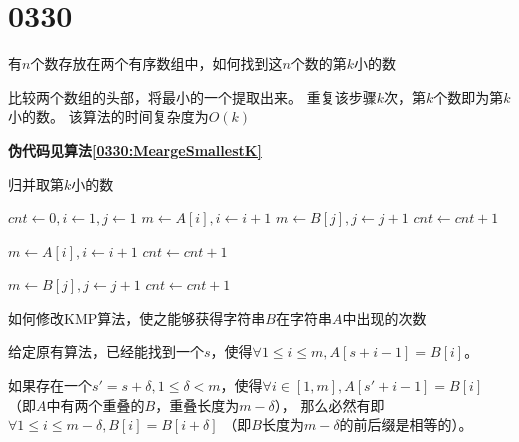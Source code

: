 \section{0330}\label{sec:0330}
\begin{questions}

    \question 有$n$个数存放在两个有序数组中，如何找到这$n$个数的第$k$小的数

    \begin{solution}
        比较两个数组的头部，将最小的一个提取出来。
        重复该步骤$k$次，第$k$个数即为第$k$小的数。
        该算法的时间复杂度为$O(k)$

        \textbf{伪代码见算法\ref{0330:MeargeSmallestK}}
    \end{solution}

    \begin{algorithm}[!htp]
        \caption{归并取第$k$小的数}\label{0330:MeargeSmallestK}
        \begin{algorithmic}[1]
             
            \State $cnt \gets 0, i \gets 1, j \gets 1$
            \State $m \gets A[i], i \gets i + 1$
            \Else
            \State $m \gets B[j], j \gets j + 1$
            \EndIf
            \State $cnt \gets cnt + 1$
            \EndWhile

            \State $m \gets A[i], i \gets i + 1$
            \State $cnt \gets cnt + 1$
            \EndWhile

            \State $m \gets B[j], j \gets j + 1$
            \State $cnt \gets cnt + 1$
            \EndWhile
        \end{algorithmic}
    \end{algorithm}


    \question 如何修改KMP算法，使之能够获得字符串$B$在字符串$A$中出现的次数

    \begin{solution}
        给定原有算法，已经能找到一个$s$，使得$\forall 1 \leq i \leq m, A[s+i-1] = B[i]$。

        如果存在一个$s' = s + \delta, 1 \leq \delta < m$，使得$\forall i \in [1,m], A[s'+i-1] = B[i]$
        （即$A$中有两个重叠的$B$，重叠长度为$m - \delta$），
        那么必然有即$\forall 1 \leq i \leq m-\delta, B[i] = B[i+\delta]$
        （即$B$长度为$m-\delta$的前后缀是相等的）。


\end{solution}
\end{questions}
